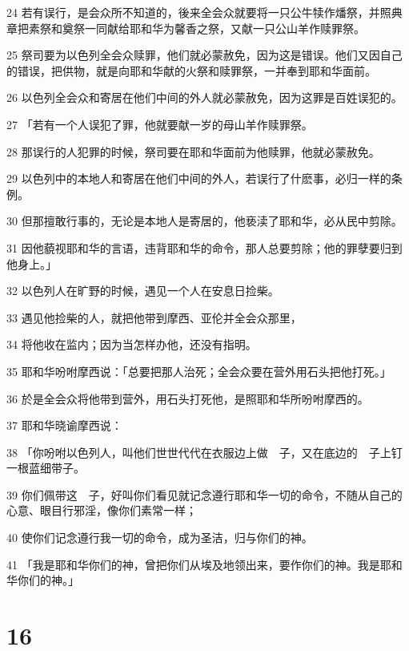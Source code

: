 \par 24 若有误行，是会众所不知道的，後来全会众就要将一只公牛犊作燔祭，并照典章把素祭和奠祭一同献给耶和华为馨香之祭，又献一只公山羊作赎罪祭。
\par 25 祭司要为以色列全会众赎罪，他们就必蒙赦免，因为这是错误。他们又因自己的错误，把供物，就是向耶和华献的火祭和赎罪祭，一并奉到耶和华面前。
\par 26 以色列全会众和寄居在他们中间的外人就必蒙赦免，因为这罪是百姓误犯的。
\par 27 「若有一个人误犯了罪，他就要献一岁的母山羊作赎罪祭。
\par 28 那误行的人犯罪的时候，祭司要在耶和华面前为他赎罪，他就必蒙赦免。
\par 29 以色列中的本地人和寄居在他们中间的外人，若误行了什麽事，必归一样的条例。
\par 30 但那擅敢行事的，无论是本地人是寄居的，他亵渎了耶和华，必从民中剪除。
\par 31 因他藐视耶和华的言语，违背耶和华的命令，那人总要剪除；他的罪孽要归到他身上。」
\par 32 以色列人在旷野的时候，遇见一个人在安息日捡柴。
\par 33 遇见他捡柴的人，就把他带到摩西、亚伦并全会众那里，
\par 34 将他收在监内；因为当怎样办他，还没有指明。
\par 35 耶和华吩咐摩西说：「总要把那人治死；全会众要在营外用石头把他打死。」
\par 36 於是全会众将他带到营外，用石头打死他，是照耶和华所吩咐摩西的。
\par 37 耶和华晓谕摩西说：
\par 38 「你吩咐以色列人，叫他们世世代代在衣服边上做　子，又在底边的　子上钉一根蓝细带子。
\par 39 你们佩带这　子，好叫你们看见就记念遵行耶和华一切的命令，不随从自己的心意、眼目行邪淫，像你们素常一样；
\par 40 使你们记念遵行我一切的命令，成为圣洁，归与你们的神。
\par 41 「我是耶和华你们的神，曾把你们从埃及地领出来，要作你们的神。我是耶和华你们的神。」

\chapter{16}

